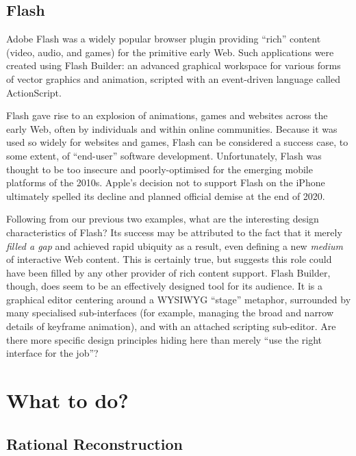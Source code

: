 \hypertarget{flash}{%
\subsection{Flash}\label{flash}}

Adobe Flash was a widely popular browser plugin providing ``rich''
content (video, audio, and games) for the primitive early Web. Such
applications were created using Flash Builder: an advanced graphical
workspace for various forms of vector graphics and animation, scripted
with an event-driven language called ActionScript.

Flash gave rise to an explosion of animations, games and websites across
the early Web, often by individuals and within online communities.
Because it was used so widely for websites and games, Flash can be
considered a success case, to some extent, of ``end-user'' software
development. Unfortunately, Flash was thought to be too insecure and
poorly-optimised for the emerging mobile platforms of the 2010s. Apple's
decision not to support Flash on the iPhone ultimately spelled its
decline and planned official demise at the end of 2020.

Following from our previous two examples, what are the interesting
design characteristics of Flash? Its success may be attributed to the
fact that it merely \emph{filled a gap} and achieved rapid ubiquity as a
result, even defining a new \emph{medium} of interactive Web content.
This is certainly true, but suggests this role could have been filled by
any other provider of rich content support. Flash Builder, though, does
seem to be an effectively designed tool for its audience. It is a
graphical editor centering around a WYSIWYG ``stage'' metaphor,
surrounded by many specialised sub-interfaces (for example, managing the
broad and narrow details of keyframe animation), and with an attached
scripting sub-editor. Are there more specific design principles hiding
here than merely ``use the right interface for the job''?

\hypertarget{what-to-do}{%
\section{What to do?}\label{what-to-do}}

\hypertarget{rational-reconstruction}{%
\subsection{Rational Reconstruction}\label{rational-reconstruction}}

